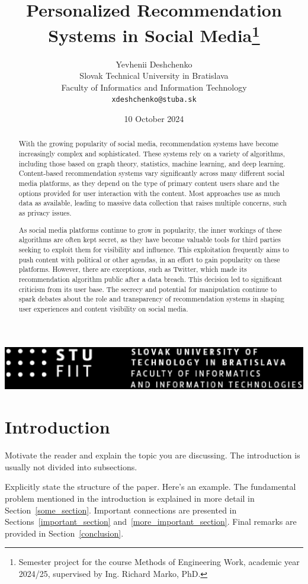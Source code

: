 \documentclass[10pt,twocolumn,twoside,a4paper]{report} %
\title{Personalized Recommendation Systems in Social Media\thanks{Semester project for the course Methods of Engineering Work, academic year 2024/25, supervised by Ing. Richard Marko, PhD.}} %
\author{Yevhenii Deshchenko\\[2pt]
	{\small Slovak Technical University in Bratislava}\\
	{\small Faculty of Informatics and Information Technology}\\
	{\small \texttt{xdeshchenko@stuba.sk}}
	}
\date{\small 10 October 2024} %
\begin{document}
\maketitle

\begin{abstract}
With the growing popularity of social media, recommendation systems have become increasingly complex and sophisticated.
These systems rely on a variety of algorithms, including those based on graph theory, statistics, machine learning, and deep learning.
Content-based recommendation systems vary significantly across many different social media platforms, as they depend on the type of primary content users share and the options provided for user interaction with the content.
Most approaches use as much data as available, leading to massive data collection that raises multiple concerns, such as privacy issues.

As social media platforms continue to grow in popularity, the inner workings of these algorithms are often kept secret, as they have become valuable tools for third parties seeking to exploit them for visibility and influence.
This exploitation frequently aims to push content with political or other agendas, in an effort to gain popularity on these platforms.
However, there are exceptions, such as Twitter, which made its recommendation algorithm public after a data breach.
This decision led to significant criticism from its user base. The secrecy and potential for manipulation continue to spark debates about the role and transparency of recommendation systems in shaping user experiences and content visibility on social media.
\end{abstract}

\includegraphics[width=\textwidth]{fiit.eps}

\section{Introduction}

Motivate the reader and explain the topic you are discussing. The introduction is usually not divided into subsections.

Explicitly state the structure of the paper. Here’s an example.
The fundamental problem mentioned in the introduction is explained in more detail in Section~\ref{some_section}.
Important connections are presented in Sections~\ref{important_section} and~\ref{more_important_section}.
Final remarks are provided in Section~\ref{conclusion}.
\end{document}
